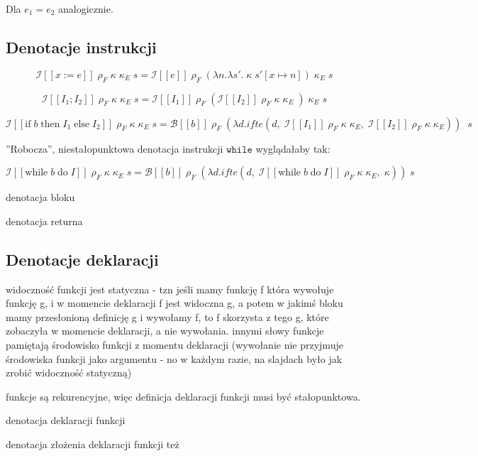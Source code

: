 \documentclass[a4paper]{article}
\begin{document}
Dla $e_1 = e_2$ analogicznie.

\subsection*{Denotacje instrukcji}

$$
\mathcal{I}[\![ x := e ]\!] \; \rho_F \; \kappa \; \kappa_E \; s = \mathcal{I}[\![ e ]\!] \; \rho_F \; (\lambda n. \lambda s'. \; \kappa \; s'[x \mapsto n]) \; \kappa_E \; s
$$

$$
\mathcal{I}[\![ I_1; I_2 ]\!] \; \rho_F \; \kappa \; \kappa_E \; s = \mathcal{I}[\![ I_1 ]\!] \; \rho_F \; (
\mathcal{I}[\![ I_2 ]\!] \; \rho_F \; \kappa \; \kappa_E \;
) \; \kappa_E \; s
$$

$$
\mathcal{I}[\![ \text{if} \; b \; \text{then} \; I_1 \; \text{else} \; I_2 ]\!] \; \rho_F \; \kappa \; \kappa_E \; s = \mathcal{B}[\![ b ]\!] \; \rho_F \; (\lambda d. ifte (d, \;
\mathcal{I}[\![ I_1 ]\!] \; \rho_F \; \kappa \; \kappa_E
, \; 
\mathcal{I}[\![ I_2 ]\!] \; \rho_F \; \kappa \; \kappa_E
)) \; \; s
$$

''Robocza'', niestałopunktowa denotacja instrukcji $\texttt{while}$ wyglądałaby tak:

$$
\mathcal{I}[\![ \text{while} \; b \; \text{do} \; I  ]\!] \; \rho_F \; \kappa \; \kappa_E \; s = \mathcal{B}[\![ b ]\!] \; \rho_F \; (\lambda d. ifte (d, \;
\mathcal{I}[\![ \text{while} \; b \; \text{do} \; I  ]\!] \; \rho_F \; \kappa \; \kappa_E
, \; 
\kappa
)) \; s
$$


denotacja bloku

denotacja returna

\subsection*{Denotacje deklaracji}

widoczność funkcji jest statyczna - tzn jeśli mamy funkcję f która wywołuje funkcję g, i w momencie deklaracji f jest widoczna g, a potem w jakimś bloku mamy przesłonioną definicję g i wywołamy f, to f skorzysta z tego g, które zobaczyła w momencie deklaracji, a nie wywołania. innymi słowy funkcje pamiętają środowisko funkcji z momentu deklaracji (wywołanie nie przyjmuje środowiska funkcji jako argumentu - no w każdym razie, na slajdach było jak zrobić widoczność statyczną)

funkcje są rekurencyjne, więc definicja deklaracji funkcji musi być stałopunktowa.

denotacja deklaracji funkcji

denotacja złożenia deklaracji funkcji też
\end{document}
